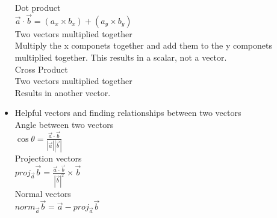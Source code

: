 \documentclass{article}
\begin{document}
\begin{itemize}
      \subitem Dot product\\
      \subsubitem $\vec{a}\cdot \vec{b}=(a_x\times b_x)+(a_y
      \times b_y)$\\
        \subsubitem Two vectors multiplied together\\
	\subsubitem Multiply the x componets together and add them
	to the y componets multiplied together. This results in a
	scalar, not a vector.\\
      \subitem Cross Product\\
        \subsubitem Two vectors multiplied together\\
	\subsubitem Results in another vector.\\
    \item Helpful vectors and finding relationships between two
      vectors\\
      \subitem Angle between two vectors\\
        \subsubitem $\cos{\theta}=\frac{\vec{a}\cdot
	\vec{b}}{|\vec{a}||\vec{b}|}$\\
      \subitem Projection vectors\\
      \subsubitem $proj_{\vec{a}}\vec{b}=\frac{\vec{a}\cdot \vec{b}}{|\vec{b}|^2}\times
      \vec{b}$\\
      \subitem Normal vectors\\
      \subsubitem $norm_{\vec{a}}\vec{b}=\vec{a}-proj_{\vec{a}}\vec{b}$\\
  \end{itemize}
\end{document}
